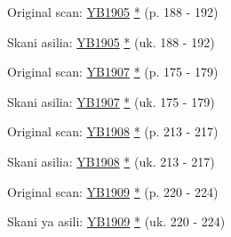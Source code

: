 Original scan: \href{https://documents.adventistarchives.org/Yearbooks/YB1905.pdf#search=Yearbook%201905}{YB1905} \href{https://forgotten-pillar.s3.us-east-2.amazonaws.com/YB1905.pdf}{*} (p. 188 - 192)


Skani asilia: \href{https://documents.adventistarchives.org/Yearbooks/YB1905.pdf#search=Yearbook%201905}{YB1905} \href{https://forgotten-pillar.s3.us-east-2.amazonaws.com/YB1905.pdf}{*} (uk. 188 - 192)






Original scan: \href{https://documents.adventistarchives.org/Yearbooks/YB1907.pdf#search=Yearbook%201906}{YB1907} \href{https://forgotten-pillar.s3.us-east-2.amazonaws.com/YB1907.pdf}{*} (p. 175 - 179)


Skani asilia: \href{https://documents.adventistarchives.org/Yearbooks/YB1907.pdf#search=Yearbook%201906}{YB1907} \href{https://forgotten-pillar.s3.us-east-2.amazonaws.com/YB1907.pdf}{*} (uk. 175 - 179)






Original scan: \href{https://documents.adventistarchives.org/Yearbooks/YB1908.pdf#search=Yearbook%201906}{YB1908} \href{https://forgotten-pillar.s3.us-east-2.amazonaws.com/YB1908.pdf}{*} (p. 213 - 217)


Skani asilia: \href{https://documents.adventistarchives.org/Yearbooks/YB1908.pdf#search=Yearbook%201906}{YB1908} \href{https://forgotten-pillar.s3.us-east-2.amazonaws.com/YB1908.pdf}{*} (uk. 213 - 217)






Original scan: \href{https://documents.adventistarchives.org/Yearbooks/YB1909.pdf#search=Yearbook%201909}{YB1909} \href{https://forgotten-pillar.s3.us-east-2.amazonaws.com/YB1909.pdf}{*} (p. 220 - 224)


Skani ya asili: \href{https://documents.adventistarchives.org/Yearbooks/YB1909.pdf#search=Yearbook%201909}{YB1909} \href{https://forgotten-pillar.s3.us-east-2.amazonaws.com/YB1909.pdf}{*} (uk. 220 - 224)






